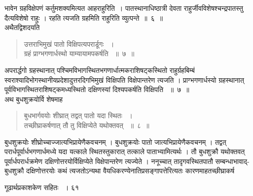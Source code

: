 \documentclass[11pt, openany]{book}
\begin{document}
\begin{sloppypar}
भावेन ग्रहविक्षेपणं कर्तुमशक्यमित्यत आह\textendash  राहुरिति~। पातस्थानाधिष्ठात्री देवता राहुर्जीवविशेषश्चन्द्रपातस्तु दैत्यविशेषो राहुः । रहति त्यजति ग्रहमिति राहुरिति व्युत्पन्ते~॥~६~॥\\ 
\noindent अथैतद्विशदयति\textendash
\end{sloppypar}
\begin{quote}

{\ssi उत्तराभिमुखं पातो विक्षिपत्यपरार्डूगः ~।\\
ग्रहं प्राग्भगणार्धस्थो याम्यायामपकर्षति ~॥~७~॥}
\end{quote}
\begin{sloppypar}
अपरार्द्धगो ग्रहस्थानात् पश्चिमविभागस्थितभगणार्धात्मकराशिषट्कस्थितो राहुर्ग्रहबिम्बं स्वराश्यादिभोगस्थानीयप्रदेशादुत्तरदिगभिमुखं विक्षिपति विक्षेपान्तरेण त्यजति । प्राग्भगणार्धस्यो ग्रहस्थानात् पूर्वविभागस्थितराशिषट्कमध्यस्थितो दक्षिणस्यां दिश्यपकर्षति विक्षिपति ~॥~७~॥\\ 
\noindent अथ बुधशुक्रयोर्वि
शेषमाह\textendash
\end{sloppypar}
\begin{quote}

{\ssi बुधभार्गवयोः शीघ्रात् तद्वत् पातो यदा स्थितः ~।\\
तच्छीघ्राकर्षणात् तौ तु विक्षिप्येते यथोक्तवत् ~॥~८~॥}
\end{quote}
\begin{sloppypar}
बुधशुक्रयोः शीघ्रोच्चाज्जात्यभिप्रायेणैकवचनम् । बुधशुक्रयोः पातो जात्यभिप्रायेणैकवचनम् । तद्वत् परार्धपूर्वार्धभगणार्धमध्ये यदा यत्काले स्थितस्तुकारात् तत्काले पाताभ्यामित्यर्थः । तौ बुधशुक्रौ यथोक्तवत् पूर्वार्धपरार्धक्रमेण दक्षिणोत्तरयोर्विक्षिप्येते विक्षेपान्तरेण त्यज्येते । ननूच्चात् तादृगवस्थितपातौ सम्बन्धाभावाद्-बुधशुक्रौ दक्षिणोत्तरयोः कथं त्यजतोऽन्यथा वैयधिकरण्येनातिप्रसङ्गापत्तेरित्यतः कारणमाह\textendash  तच्छीघ्राकर्ष\textendash
\end{sloppypar}

\newpage

\hspace{3cm}गूढार्थप्रकाशकेण सहितः ~। \hfill ६१
\vspace{1cm}
\end{document}

